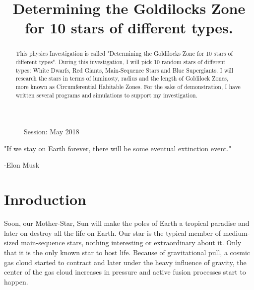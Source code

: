 \documentclass[a4paper, 12pt]{article}
\title{Determining the Goldilocks Zone for 10 stars of different types.}
\date{}
\author{}
\begin{document}
\maketitle
\tableofcontents
\begin{figure}
  \begin{flushleft}
    Session: May 2018\\
    \end{flushleft}
  \end{figure}
\newpage
{}
\doublespacing

\begin{center}
  "If we stay on Earth forever, there will be some eventual extinction event." 
  \end{center}
\begin{flushright}
  -Elon Musk \cite{musk}
\end{flushright}

\begin{abstract}
  This physics Investigation is called "Determining the Goldilocks Zone for 10 stars of different types". During this investigation, I will pick 10 random stars of different types: White Dwarfs, Red Giants, Main-Sequence Stars and Blue Supergiants. I will research the stars in terms of luminosty, radius and the length of Goldilock Zones, more known as Circumferential Habitable Zones. For the sake of demonstration, I have written several programs and simulations to support my investigation. 
  \end{abstract}

\section{Inroduction}

Soon, our Mother-Star, Sun will make the poles of Earth a tropical paradise and later on destroy all the life on Earth. Our star is the typical member of medium-sized main-sequence stars, nothing interesting or extraordinary about it. Only that it is the only known star to host life. Because of gravitational pull, a cosmic gas cloud started to contract and later under the heavy influence of gravity, the center of the gas cloud increases in pressure and active fusion processes start to happen. 




  
\end{document}
